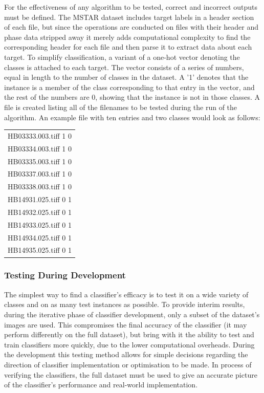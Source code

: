 For the effectiveness of any algorithm to be tested, correct and incorrect outputs must be defined. The MSTAR dataset includes target labels in a header section of each file, but since the operations are conducted on files with their header and phase data stripped away it merely adds computational complexity to find the corresponding header for each file and then parse it to extract data about each target. 
To simplify classification, a variant of a one-hot vector denoting the classes is attached to each target. The vector consists of a series of numbers, equal in length to the number of classes in the dataset. A '1' denotes that the instance is a member of the class corresponding to that entry in the vector, and the rest of the numbers are 0, showing that the instance is not in those classes. A file is created listing all of the filenames to be tested during the run of the algorithm. An example file with ten entries and two classes would look as follows:\\

\begin{center}
\begin{tabular}{c}
HB03333.003.tiff 1 0 \\
HB03334.003.tiff 1 0 \\
HB03335.003.tiff 1 0 \\
HB03337.003.tiff 1 0 \\
HB03338.003.tiff 1 0 \\
HB14931.025.tiff 0 1 \\
HB14932.025.tiff 0 1 \\
HB14933.025.tiff 0 1 \\
HB14934.025.tiff 0 1 \\
HB14935.025.tiff 0 1 \\


\end{tabular}
\end{center}

\subsubsection{Testing During Development}
The simplest way to find a classifier's efficacy is to test it on a wide variety of classes and on as many test instances as possible. To provide interim results, during the iterative phase of classifier development, only a subset of the dataset's images are used. This compromises the final accuracy of the classifier (it may perform differently on the full dataset), but bring with it the ability to test and train classifiers more quickly, due to the lower computational overheads. During the development this testing method allows for simple decisions regarding the direction of classifier implementation or optimisation to be made. In process of verifying the classifiers, the full dataset must be used to give an accurate picture of the classifier's performance and real-world implementation. 

